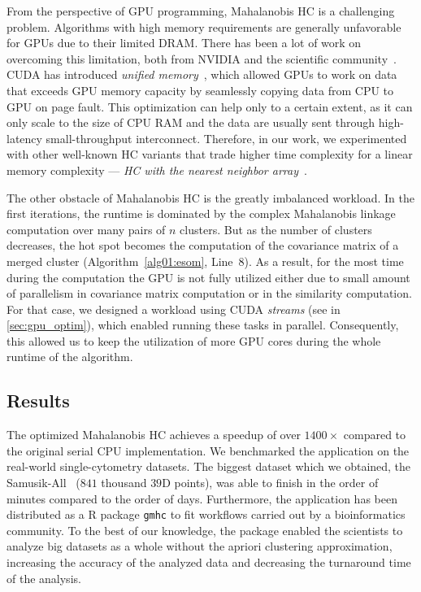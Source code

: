 From the perspective of GPU programming, Mahalanobis HC is a challenging problem. Algorithms with high memory requirements are generally unfavorable for GPUs due to their limited DRAM. There has been a lot of work on overcoming this limitation, both from NVIDIA and the scientific community~\cite{zheng2016towards,kim2020batch,landaverde2014investigation}. CUDA has introduced \emph{unified memory}~\cite{site:cuda}, which allowed GPUs to work on data that exceeds GPU memory capacity by seamlessly copying data from CPU to GPU on page fault. This optimization can help only to a certain extent, as it can only scale to the size of CPU RAM and the data are usually sent through high-latency small-throughput interconnect. Therefore, in our work, we experimented with other well-known HC variants that trade higher time complexity for a linear memory complexity --- \emph{HC with the nearest neighbor array}~\cite{day1984efficient}.


The other obstacle of Mahalanobis HC is the greatly imbalanced workload. In the first iterations, the runtime is dominated by the complex Mahalanobis linkage computation over many pairs of $n$ clusters. But as the number of clusters decreases, the hot spot becomes the computation of the covariance matrix of a merged cluster (Algorithm~\ref{alg01:esom}, Line~8). As a result, for the most time during the computation the GPU is not fully utilized either due to small amount of parallelism in covariance matrix computation or in the similarity computation. For that case, we designed a workload using CUDA \emph{streams} (see  in \cref{sec:gpu_optim}), which enabled running these tasks in parallel. Consequently, this allowed us to keep the utilization of more GPU cores during the whole runtime of the algorithm.

\subsection{Results}

The optimized Mahalanobis HC achieves a speedup of over $1400\times$ compared to the original serial CPU implementation. We benchmarked the application on the real-world single-cytometry datasets. The biggest dataset which we obtained, the Samusik-All~\cite{flowrepo} ($841$ thousand $39$D points), was able to finish in the order of minutes compared to the order of days. Furthermore, the application has been distributed as a R package \texttt{gmhc} to fit workflows carried out by a bioinformatics community. To the best of our knowledge, the package enabled the scientists to analyze big datasets as a whole without the apriori clustering approximation, increasing the accuracy of the analyzed data and decreasing the turnaround time of the analysis.

